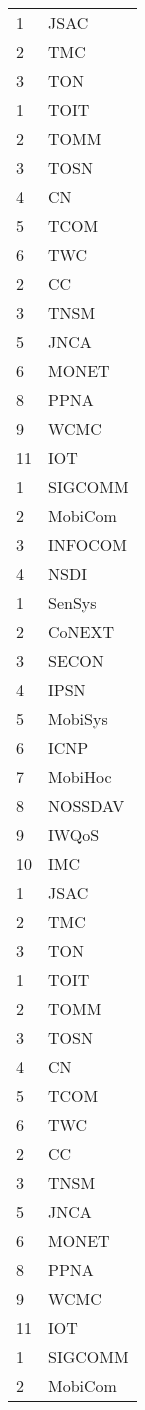 \documentclass[doctor, vlined]{DissertUESTC}
\begin{document}
\begin{longtable}{p{2em} p{4.5em}}
		1 & JSAC \\
		2 & TMC \\
		3 & TON \\
		1 & TOIT \\
		2 & TOMM \\
		3 & TOSN \\
		4 & CN \\
		5 & TCOM \\
		6 & TWC \\
		2 & CC \\
		3 & TNSM \\
		5 & JNCA \\
		6 & MONET \\
		8 & PPNA \\
		9 & WCMC \\
		11 & IOT \\
		1 & SIGCOMM \\
		2 & MobiCom \\
		3 & INFOCOM \\
		4 & NSDI \\
		1 & SenSys \\
		2 & CoNEXT \\
		3 & SECON \\
		4 & IPSN \\
		5 & MobiSys \\
		6 & ICNP \\
		7 & MobiHoc \\
		8 & NOSSDAV \\
		9 & IWQoS \\
		10 & IMC \\
		1 & JSAC \\
		2 & TMC \\
		3 & TON \\
		1 & TOIT \\
		2 & TOMM \\
		3 & TOSN \\
		4 & CN \\
		5 & TCOM \\
		6 & TWC \\
		2 & CC \\
		3 & TNSM \\
		5 & JNCA \\
		6 & MONET \\
		8 & PPNA \\
		9 & WCMC \\
		11 & IOT \\
		1 & SIGCOMM \\
		2 & MobiCom \\

\end{longtable}
\end{document}
